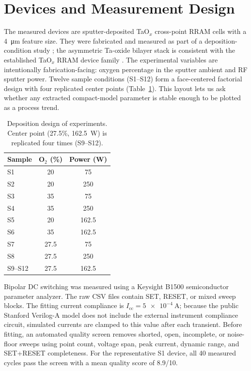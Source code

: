 \documentclass[journal]{IEEEtran}
\begin{document}
\section{Devices and Measurement Design}
\label{sec:devices}

The measured devices are sputter-deposited TaO$_x$ cross-point RRAM cells
with a \SI{4}{\micro\meter} feature size.  They were fabricated and measured
as part of a deposition-condition study
\cite{chowdhury2025mwscas,moazzeni2023}; the asymmetric Ta-oxide bilayer
stack is consistent with the established TaO$_x$ RRAM device family
\cite{lee2011fast,wouters2015}.  The experimental variables are intentionally
fabrication-facing: oxygen percentage in the sputter ambient and RF sputter
power.  Twelve sample conditions (S1--S12) form a face-centered factorial
design with four replicated center points (Table~\ref{tab:doe}).  This layout
lets us ask whether any extracted compact-model parameter is stable enough to
be plotted as a process trend.

\begin{table}[!t]
\centering
\caption{Deposition design of experiments. Center point (27.5\%,
\SI{162.5}{\watt}) is replicated four times (S9--S12).}
\label{tab:doe}
\footnotesize
\begin{tabular}{@{}lcc@{}}
\toprule
Sample & O$_2$ (\%) & Power (W)\\
\midrule
S1 & 20   & 75\\
S2 & 20   & 250\\
S3 & 35   & 75\\
S4 & 35   & 250\\
S5 & 20   & 162.5\\
S6 & 35   & 162.5\\
S7 & 27.5 & 75\\
S8 & 27.5 & 250\\
S9--S12 & 27.5 & 162.5\\
\bottomrule
\end{tabular}
\end{table}

Bipolar DC switching was measured using a Keysight B1500 semiconductor
parameter analyzer.  The raw CSV files contain SET, RESET, or mixed sweep
blocks.  The fitting current compliance is
$I_{\mathrm{cc}}=\SI{5e-4}{\ampere}$; because the public Stanford Verilog-A
model does not include the external instrument compliance circuit, simulated
currents are clamped to this value after each transient.  Before fitting, an
automated quality screen removes shorted, open, incomplete, or noise-floor
sweeps using point count, voltage span, peak current, dynamic range, and
SET+RESET completeness.  For the representative S1 device, all 40 measured
cycles pass the screen with a mean quality score of 8.9/10.
\end{document}
